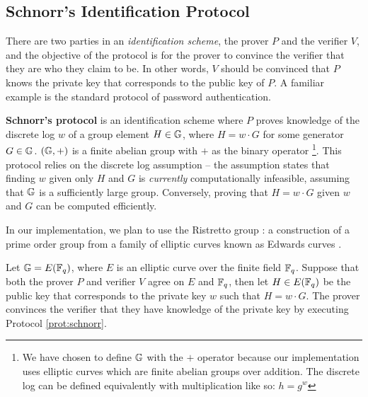 \subsection{Schnorr's Identification Protocol}\label{sec:schnorr}
There are two parties in an \textit{identification scheme}, the prover $P$ and the verifier $V$, and the objective of the protocol is for the prover to convince the verifier that they are who they claim to be. In other words, $V$ should be convinced that $P$ knows the private key that corresponds to the public key of $P$. A familiar example is the standard protocol of password authentication.

\textbf{Schnorr's protocol} \cite{Schnorr} is an identification scheme where $P$ proves knowledge of the discrete log $w$ of a group element $H \in \mathbb{G}$, where $H = w \cdot G$ for some generator $G \in \mathbb{G}$. $(\mathbb{G}, +)$ is a finite abelian group with $+$ as the binary operator 
\footnote{We have chosen to define $\mathbb{G}$ with the $+$ operator because our implementation uses elliptic curves which are finite abelian groups over addition. The discrete log can be defined equivalently with multiplication like so: $h = g^w$}. 
This protocol relies on the discrete log assumption \cite{Diffie1976NewDI} -- the assumption states that finding $w$ given only $H$ and $G$ is \textit{currently} computationally infeasible, assuming that $\mathbb{G}$ is a sufficiently large group. Conversely, proving that $H = w \cdot G$ given $w$ and $G$ can be computed efficiently. 

In our implementation, we plan to use the Ristretto group \cite{ristretto_web}: a construction of a prime order group from a family of elliptic curves known as Edwards curves \cite{Edwards2007}. 

\begin{definition}\label{def:schnorr}
    Let $\mathbb{G} = E(\mathbb{F}_q)$, where $E$ is an elliptic curve over the finite field $\mathbb{F}_q$. Suppose that both the prover $P$ and verifier $V$ agree on $E$ and $\mathbb{F}_q$, then let $H \in E(\mathbb{F}_q)$ be the public key that corresponds to the private key $w$ such that $H = w \cdot G$. The prover convinces the verifier that they have knowledge of the private key by executing Protocol \ref{prot:schnorr}.
\end{definition}

